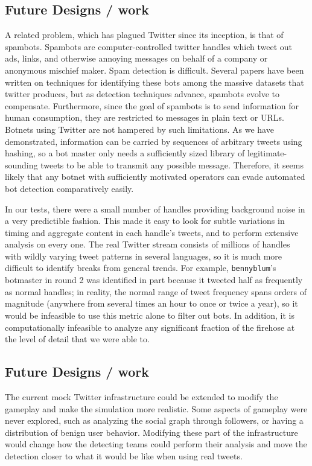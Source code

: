 \documentclass[11pt, oneside]{article} %
\numberwithin{equation}{section} %
\numberwithin{figure}{section} %
\numberwithin{table}{section} %
\renewcommand{\c}[1]{\texttt{#1}}
\newcommand{\teambb}{\c{bennyblum}}
\begin{document}
	\subsection{Future Designs / work}
        A related problem, which has plagued Twitter since its inception, is that of spambots. Spambots are computer-controlled twitter handles which tweet out ads, links, and otherwise annoying messages on behalf of a company or anonymous mischief maker. Spam detection is difficult. Several papers have been written on techniques for identifying these bots among the massive datasets that twitter produces, but as detection techniques advance, spambots evolve to compensate. Furthermore, since the goal of spambots is to send information for human consumption, they are restricted to messages in plain text or URLs. Botnets using Twitter are not hampered by such limitations. As we have demonstrated, information can be carried by sequences of arbitrary tweets using hashing, so a bot master only needs a sufficiently sized library of legitimate-sounding tweets to be able to transmit any possible message. Therefore, it seems likely that any botnet with sufficiently motivated operators can evade automated bot detection comparatively easily.
        
        In our tests, there were a small number of handles providing background noise in a very predictible fashion. This made it easy to look for subtle variations in timing and aggregate content in each handle's tweets, and to perform extensive analysis on every one. The real Twitter stream consists of millions of handles with wildly varying tweet patterns in several languages, so it is much more difficult to identify breaks from general trends. For example, \teambb{}'s botmaster in round 2 was identified in part because it tweeted half as frequently as normal handles; in reality, the normal range of tweet frequency spans orders of magnitude (anywhere from several times an hour to once or twice a year), so it would be infeasible to use this metric alone to filter out bots. In addition, it is computationally infeasible to analyze any significant fraction of the firehose at the level of detail that we were able to. 
        \subsection{Future Designs / work}

        The current mock Twitter infrastructure could be extended to modify the gameplay and make the simulation more realistic. Some aspects of gameplay were never explored, such as analyzing the social graph through followers, or having a distribution of benign user behavior. Modifying these part of the infrastructure would change how the detecting teams could perform their analysis and move the detection closer to what it would be like when using real tweets. \\
\end{document}

